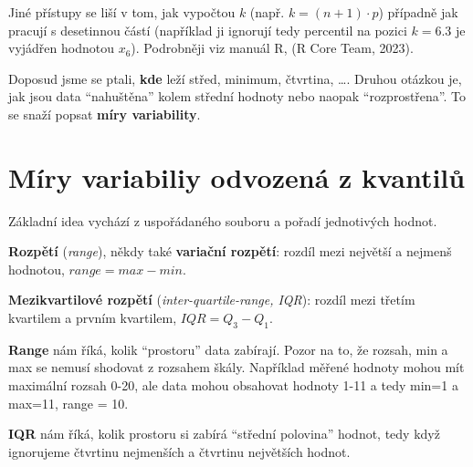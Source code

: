 \documentclass[
  czech,
  11pt,
  letterpaper,
  DIV=11,
  numbers=noendperiod]{scrreprt}
\begin{document}
\begin{tcolorbox}[enhanced jigsaw, arc=.35mm, bottomrule=.15mm, bottomtitle=1mm, breakable, colback=white, colbacktitle=quarto-callout-note-color!10!white, colframe=quarto-callout-note-color-frame, coltitle=black, left=2mm, leftrule=.75mm, opacityback=0, opacitybacktitle=0.6, rightrule=.15mm, title=\textcolor{quarto-callout-note-color}{\faInfo}\hspace{0.5em}{Poznámka}, titlerule=0mm, toprule=.15mm, toptitle=1mm]

Jiné přístupy se liší v tom, jak vypočtou \(k\) (např.
\(k=(n+1)\cdot p\)) případně jak pracují s desetinnou částí (například
ji ignorují tedy percentil na pozici \(k=6.3\) je vyjádřen hodnotou
\(x_6\)). Podrobněji viz manuál R, (R Core Team, 2023).

\end{tcolorbox}

Doposud jsme se ptali, \textbf{kde} leží střed, minimum, čtvrtina,
\ldots. Druhou otázkou je, jak jsou data ``nahuštěna'' kolem střední
hodnoty nebo naopak ``rozprostřena''. To se snaží popsat \textbf{míry
variability}.

\section{Míry variabiliy odvozená z
kvantilů}\label{muxedry-variabiliy-odvozenuxe1-z-kvantilux16f}

Základní idea vychází z uspořádaného souboru a pořadí jednotivých
hodnot.

\textbf{Rozpětí} (\emph{range}), někdy také \textbf{variační rozpětí}:
rozdíl mezi největší a nejmenš hodnotou, \textbf{\(range = max-min\)}.

\textbf{Mezikvartilové rozpětí} (\emph{inter-quartile-range, IQR}):
rozdíl mezi třetím kvartilem a prvním kvartilem,
\textbf{\(IQR=Q_3-Q_1\)}.

\begin{tcolorbox}[enhanced jigsaw, arc=.35mm, bottomrule=.15mm, bottomtitle=1mm, breakable, colback=white, colbacktitle=quarto-callout-note-color!10!white, colframe=quarto-callout-note-color-frame, coltitle=black, left=2mm, leftrule=.75mm, opacityback=0, opacitybacktitle=0.6, rightrule=.15mm, title=\textcolor{quarto-callout-note-color}{\faInfo}\hspace{0.5em}{Poznámka}, titlerule=0mm, toprule=.15mm, toptitle=1mm]

\textbf{Range} nám říká, kolik ``prostoru'' data zabírají. Pozor na to,
že rozsah, min a max se nemusí shodovat z rozsahem škály. Například
měřené hodnoty mohou mít maximální rozsah 0-20, ale data mohou obsahovat
hodnoty 1-11 a tedy min=1 a max=11, range = 10.

\textbf{IQR} nám říká, kolik prostoru si zabírá ``střední polovina''
hodnot, tedy když ignorujeme čtvrtinu nejmenších a čtvrtinu největších
hodnot.

\end{tcolorbox}
\end{document}
